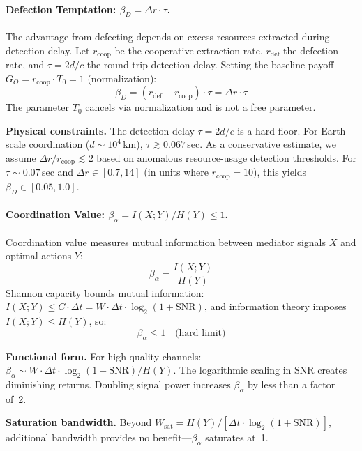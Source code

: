 \documentclass[11pt]{article}
\begin{document}
\paragraph{Defection Temptation: $\beta_D = \Delta r \cdot \tau$.}
The advantage from defecting depends on excess resources extracted during detection delay. Let $r_{\text{coop}}$ be the cooperative extraction rate, $r_{\text{def}}$ the defection rate, and $\tau = 2d/c$ the round-trip detection delay. Setting the baseline payoff $G_O = r_{\text{coop}} \cdot T_0 = 1$ (normalization):
\begin{equation}
\beta_D = (r_{\text{def}} - r_{\text{coop}}) \cdot \tau = \Delta r \cdot \tau
\end{equation}
The parameter $T_0$ cancels via normalization and is not a free parameter.

\textbf{Physical constraints.} The detection delay $\tau = 2d/c$ is a hard floor. For Earth-scale coordination ($d \sim 10^4$\,km), $\tau \gtrsim 0.067$\,sec. As a conservative estimate, we assume $\Delta r / r_{\text{coop}} \lesssim 2$ based on anomalous resource-usage detection thresholds. For $\tau \sim 0.07$\,sec and $\Delta r \in [0.7, 14]$ (in units where $r_{\text{coop}} = 10$), this yields $\beta_D \in [0.05, 1.0]$.

\paragraph{Coordination Value: $\beta_\alpha = I(X;Y)/H(Y) \leq 1$.}
Coordination value measures mutual information between mediator signals $X$ and optimal actions $Y$:
\begin{equation}
\beta_\alpha = \frac{I(X; Y)}{H(Y)}
\end{equation}
Shannon capacity bounds mutual information: $I(X;Y) \leq C \cdot \Delta t = W \cdot \Delta t \cdot \log_2(1 + \text{SNR})$, and information theory imposes $I(X;Y) \leq H(Y)$, so:
\begin{equation}
\beta_\alpha \leq 1 \quad \text{(hard limit)}
\end{equation}

\textbf{Functional form.} For high-quality channels: $\beta_\alpha \sim W \cdot \Delta t \cdot \log_2(1+\text{SNR})/H(Y)$. The logarithmic scaling in SNR creates diminishing returns. Doubling signal power increases $\beta_\alpha$ by less than a factor of~2.

\textbf{Saturation bandwidth.} Beyond $W_{\text{sat}} = H(Y)/[\Delta t \cdot \log_2(1+\text{SNR})]$, additional bandwidth provides no benefit---$\beta_\alpha$ saturates at~1.
\end{document}
